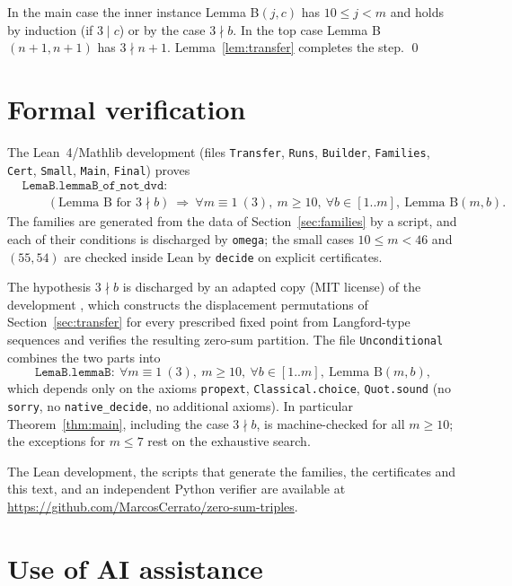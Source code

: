 \documentclass[11pt]{amsart}
\theoremstyle{definition}
\theoremstyle{remark}
\newcommand{\Icc}[2]{[#1..#2]}
\begin{document}
In the main case the inner instance Lemma B$(j,c)$ has $10\le j<m$ and holds by induction (if $3\mid c$) or by the
case $3\nmid b$. In the top case Lemma B$(n+1,n+1)$ has $3\nmid n+1$. Lemma~\ref{lem:transfer} completes the step.
\qed

\section{Formal verification}\label{sec:lean}

The Lean~4/Mathlib development (files \texttt{Transfer}, \texttt{Runs}, \texttt{Builder}, \texttt{Families},
\texttt{Cert}, \texttt{Small}, \texttt{Main}, \texttt{Final}) proves
\[
\begin{aligned}
&\texttt{LemaB.lemmaB\_of\_not\_dvd}:\\
&\qquad(\text{Lemma B for }3\nmid b)\ \Longrightarrow\ \forall m\equiv1\ (3),\ m\ge10,\
\forall b\in\Icc1m,\ \text{Lemma B}(m,b).
\end{aligned}
\]
The families are generated from the data of Section~\ref{sec:families} by a script,
and each of their conditions is discharged by \texttt{omega}; the small cases $10\le m<46$ and $(55,54)$ are
checked inside Lean by \texttt{decide} on explicit certificates.

The hypothesis $3\nmid b$ is discharged by an adapted copy (MIT license) of the development \cite{Jo}, which
constructs the displacement permutations of Section~\ref{sec:transfer} for every prescribed fixed point from
Langford-type sequences and verifies the resulting zero-sum partition. The file \texttt{Unconditional} combines
the two parts into
\[
\texttt{LemaB.lemmaB}:\ \forall m\equiv1\ (3),\ m\ge10,\ \forall b\in\Icc1m,\ \text{Lemma B}(m,b),
\]
which depends only on the axioms \texttt{propext}, \texttt{Classical.choice}, \texttt{Quot.sound}
(no \texttt{sorry}, no \texttt{native\_decide}, no additional axioms). In particular Theorem~\ref{thm:main},
including the case $3\nmid b$, is machine-checked for all $m\ge10$; the exceptions for $m\le7$ rest on the
exhaustive search.

The Lean development, the scripts that generate the families, the certificates and this text, and an
independent Python verifier are available at \url{https://github.com/MarcosCerrato/zero-sum-triples}.

\section*{Use of AI assistance}
\end{document}
